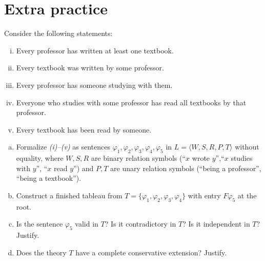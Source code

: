 \section*{Extra practice}


\begin{problem}
    
    Consider the following statements:
    \begin{enumerate}[(i)]\it
        \item Every professor has written at least one textbook.
        \item Every textbook was written by some professor.
        \item Every professor has someone studying with them.
        \item Everyone who studies with some professor has read all textbooks by that professor.
        \item Every textbook has been read by someone.
    \end{enumerate}    
    \begin{enumerate}[(a)]
        \item Formalize {\it(i)--(v)} as sentences $\varphi_1,\varphi_2,\varphi_3,\varphi_4,\varphi_5$ in $L=\langle W, S, R, P, T\rangle$ without equality, where $W,S,R$ are binary relation symbols (``$x$ wrote $y$'',``$x$ studies with $y$'', ``$x$ read $y$'') and $P,T$ are unary relation symbols (``being a professor'', ``being a textbook'').
        \item Construct a finished tableau from $T=\{\varphi_1,\varphi_2,\varphi_3,\varphi_4\}$ with entry $F\varphi_5$ at the root.
        \item Is the sentence $\varphi_5$ valid in $T$? Is it contradictory in $T$? Is it independent in $T$? Justify.
        \item Does the theory $T$ have a complete conservative extension? Justify.
    \end{enumerate}

\end{problem}


